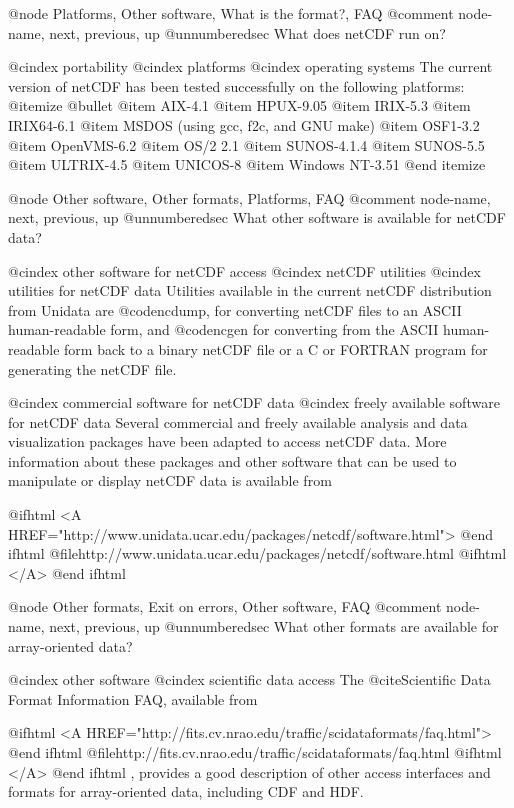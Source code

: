 {@node Platforms, Other software, What is the format?, FAQ
@comment  node-name,  next,  previous,  up
@unnumberedsec What does netCDF run on?

@cindex portability
@cindex platforms
@cindex operating systems
The current version of netCDF has been tested successfully on the
following platforms:
@itemize @bullet
@item
AIX-4.1
@item
HPUX-9.05
@item
IRIX-5.3
@item
IRIX64-6.1
@item
MSDOS (using gcc, f2c, and GNU make)
@item
OSF1-3.2
@item
OpenVMS-6.2
@item
OS/2 2.1
@item
SUNOS-4.1.4
@item
SUNOS-5.5
@item
ULTRIX-4.5
@item
UNICOS-8
@item
Windows NT-3.51
@end itemize



@node Other software, Other formats, Platforms, FAQ
@comment  node-name,  next,  previous,  up
@unnumberedsec What other software is available for netCDF data?

@cindex other software for netCDF access
@cindex netCDF utilities
@cindex utilities for netCDF data
Utilities available in the current netCDF distribution from Unidata are
@code{ncdump}, for converting netCDF files to an ASCII human-readable
form, and @code{ncgen} for converting from the ASCII human-readable form
back to a binary netCDF file or a C or FORTRAN program for generating
the netCDF file.

@cindex commercial software for netCDF data
@cindex freely available software for netCDF data
Several commercial and freely available analysis and data visualization
packages have been adapted to access netCDF data.
More information about these packages and
other software that can be used to manipulate or display netCDF data is
available from

@ifhtml
<A HREF="http://www.unidata.ucar.edu/packages/netcdf/software.html">
@end ifhtml
@file{http://www.unidata.ucar.edu/packages/netcdf/software.html}
@ifhtml
</A>
@end ifhtml

@node Other formats, Exit on errors, Other software, FAQ
@comment  node-name,  next,  previous,  up
@unnumberedsec What other formats are available for array-oriented data?

@cindex other software
@cindex scientific data access
The @cite{Scientific Data Format Information FAQ}, available from

@ifhtml
<A
HREF="http://fits.cv.nrao.edu/traffic/scidataformats/faq.html">
@end ifhtml
@file{http://fits.cv.nrao.edu/traffic/scidataformats/faq.html}
@ifhtml
</A>
@end ifhtml
,
provides a good description of other access interfaces and formats for
array-oriented data, including CDF and HDF.


}
